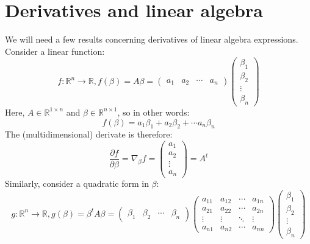 \documentclass[12pt, a4paper]{article}
\begin{document}
\section{Derivatives and linear algebra}
We will need a few results concerning derivatives of linear algebra expressions. Consider a linear function:
\begin{equation}
f: \mathbb{R}^n\rightarrow\mathbb{R}, f(\beta)=A\beta=
\begin{pmatrix}
a_1 & a_2 & \cdots & a_n
\end{pmatrix}
\begin{pmatrix}
\beta_1 \\ \beta_2 \\ \vdots \\ \beta_n
\end{pmatrix}
\end{equation}
Here, $A\in\mathbb{R}^{1\times n}$ and $\beta\in\mathbb{R}^{n\times 1}$, so in other words:
\begin{equation}
f(\beta)=a_1\beta_1+a_2\beta_2+\cdots a_n\beta_n
\end{equation}
The (multidimensional) derivate is therefore:
\begin{equation}
\label{scalarproductdif}
\frac{\partial f}{\partial \beta}=\nabla_\beta f=
\begin{pmatrix}
a_1 \\ a_2 \\ \vdots \\ a_n
\end{pmatrix}
=A^t
\end{equation}
Similarly, consider a quadratic form in $\beta$:
\begin{equation}
g: \mathbb{R}^n\rightarrow\mathbb{R}, g(\beta)=\beta^t A\beta =
\begin{pmatrix}
\beta_1 & \beta_2 & \cdots & \beta_n
\end{pmatrix}
\begin{pmatrix}
a_{11} & a_{12} & \cdots & a_{1n} \\
a_{21} & a_{22} & \cdots & a_{2n} \\
\vdots & \vdots & \ddots & \vdots \\
a_{n1} & a_{n2} & \cdots & a_{nn}
\end{pmatrix}
\begin{pmatrix}
\beta_1 \\ \beta_2 \\ \vdots \\ \beta_n
\end{pmatrix}
\end{equation}
\end{document}
